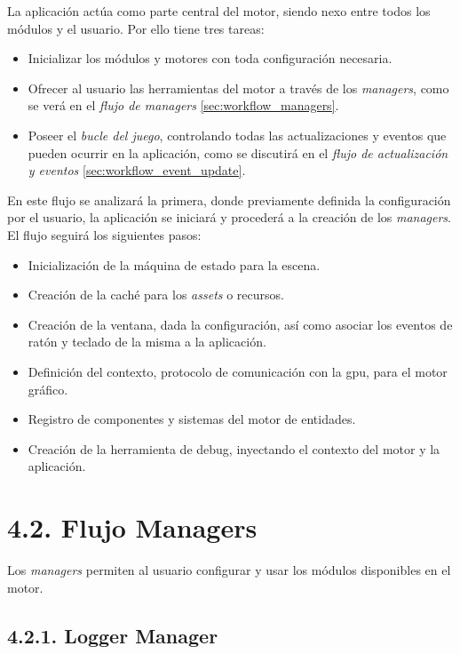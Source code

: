 La aplicación actúa como parte central del motor, siendo nexo entre todos los módulos y el usuario. Por ello tiene tres tareas:
\begin{itemize}
    \item Inicializar los módulos y motores con toda configuración necesaria.
    \item Ofrecer al usuario las herramientas del motor a través de los \textit{managers}, como se verá en el \textit{flujo de managers} \ref{sec:workflow_managers}.
    \item Poseer el \textit{bucle del juego}\cite{game-loop-pattern}, controlando todas las actualizaciones y eventos que pueden 
    ocurrir en la aplicación, como se discutirá en el \textit{flujo de actualización y eventos} \ref{sec:workflow_event_update}.
\end{itemize}
En este flujo se analizará la primera, donde previamente definida la configuración por el usuario, la aplicación se iniciará y 
procederá a la creación de los \textit{managers}. El flujo seguirá los siguientes pasos:
\begin{itemize}
    \item Inicialización de la máquina de estado para la escena.
    \item Creación de la caché para los \textit{assets} o recursos.
    \item Creación de la ventana, dada la configuración, así como asociar los eventos de ratón y teclado de la misma a la aplicación.
    \item Definición del contexto, protocolo de comunicación con la \gls{gpu}, para el motor gráfico.
    \item Registro de componentes y sistemas del motor de entidades.
    \item Creación de la herramienta de debug, inyectando el contexto del motor y la aplicación.
\end{itemize}

\section*{4.2. Flujo Managers}\label{sec:workflow_managers}

Los \textit{managers} permiten al usuario configurar y usar los módulos disponibles en el motor.

\subsection*{4.2.1. Logger Manager}\label{sec:workflow_managers_logger}

